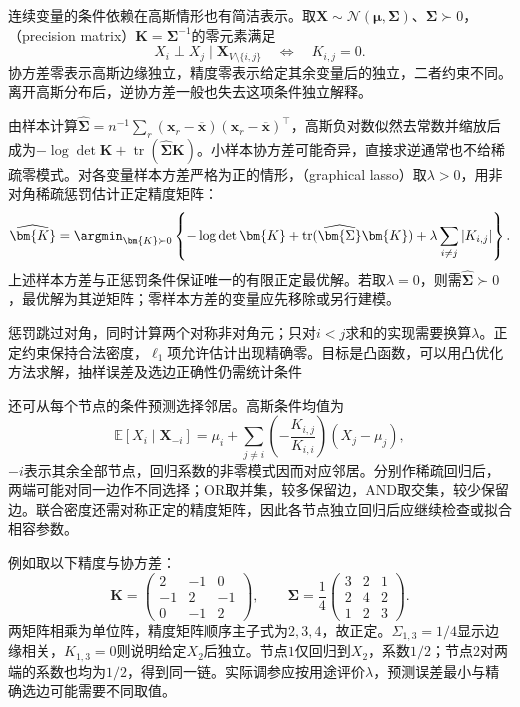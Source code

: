 连续变量的条件依赖在高斯情形也有简洁表示。取$\bm{X}\sim\mathcal{N}(\bm{\mu},\bm{\Sigma})$、$\bm{\Sigma}\succ0$，（precision matrix）$\bm{K}=\bm{\Sigma}^{-1}$的零元素满足
\[
  X_i\perp X_j\mid\bm{X}_{V\setminus\{i,j\}}
  \quad\Longleftrightarrow\quad K_{i,j}=0.
\]
协方差零表示高斯边缘独立，精度零表示给定其余变量后的独立，二者约束不同。离开高斯分布后，逆协方差一般也失去这项条件独立解释。

由样本计算$\widehat{\bm{\Sigma}}=n^{-1}\sum_r(\bm{x}_r-\overline{\bm{x}})(\bm{x}_r-\overline{\bm{x}})^{\top}$，高斯负对数似然去常数并缩放后成为$-\log\det\bm{K}+\operatorname{tr}(\widehat{\bm{\Sigma}}\bm{K})$。小样本协方差可能奇异，直接求逆通常也不给稀疏零模式。对各变量样本方差严格为正的情形，（graphical lasso）取$\lambda>0$，用非对角稀疏惩罚估计正定精度矩阵：
\begin{equation}
  \widehat{\bm{K}}
  =\argmin_{\bm{K}\succ0}
    \left\{-\log\det\bm{K}
      +\operatorname{tr}(\widehat{\bm{\Sigma}}\bm{K})
      +\lambda\sum_{i\ne j}|K_{i,j}|\right\}.
  \label{eq:pgm-structure-learning-glasso}
\end{equation}
上述样本方差与正惩罚条件保证唯一的有限正定最优解。若取$\lambda=0$，则需$\widehat{\bm{\Sigma}}\succ0$，最优解为其逆矩阵；零样本方差的变量应先移除或另行建模。

惩罚跳过对角，同时计算两个对称非对角元；只对$i<j$求和的实现需要换算$\lambda$。正定约束保持合法密度，$\ell_1$项允许估计出现精确零。目标是凸函数，可以用凸优化方法求解，抽样误差及选边正确性仍需统计条件

还可从每个节点的条件预测选择邻居。高斯条件均值为
\[
  \mathbb{E}[X_i\mid\bm{X}_{-i}]
  =\mu_i+\sum_{j\ne i}
    \left(-\frac{K_{i,j}}{K_{i,i}}\right)(X_j-\mu_j),
\]
$-i$表示其余全部节点，回归系数的非零模式因而对应邻居。分别作稀疏回归后，两端可能对同一边作不同选择；OR取并集，较多保留边，AND取交集，较少保留边。联合密度还需对称正定的精度矩阵，因此各节点独立回归后应继续检查或拟合相容参数。

例如取以下精度与协方差：
\[
  \bm{K}=
  \begin{pmatrix}
    2&-1&0\\
    -1&2&-1\\
    0&-1&2
  \end{pmatrix},
  \qquad
  \bm{\Sigma}=\frac14
  \begin{pmatrix}
    3&2&1\\
    2&4&2\\
    1&2&3
  \end{pmatrix}.
\]
两矩阵相乘为单位阵，精度矩阵顺序主子式为$2,3,4$，故正定。$\Sigma_{1,3}=1/4$显示边缘相关，$K_{1,3}=0$则说明给定$X_2$后独立。节点$1$仅回归到$X_2$，系数$1/2$；节点$2$对两端的系数也均为$1/2$，得到同一链。实际调参应按用途评价$\lambda$，预测误差最小与精确选边可能需要不同取值。


